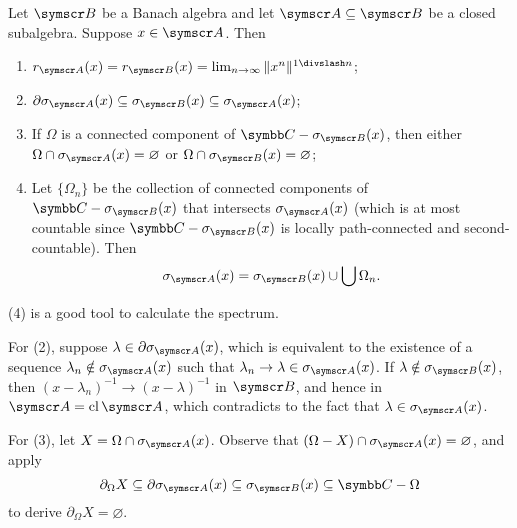 \begin{proposition}
  Let $\BA B$ be a Banach algebra and let $\BA A\subseteq \BA B$ be a closed subalgebra. Suppose $x\in\BA A$. Then
  \begin{enumerate}[label=(\arabic*)]
    \item $r_{\BA A}(x) = r_{\BA B}(x) = \lim_{n\to\infty}\NORM{x^n}^{1\DIV n}$;
    \item $\partial\sigma_{\BA A}(x)\subseteq\sigma_{\BA B}(x)\subseteq \sigma_{\BA A}(x)$;
    \item If $\Omega$ is a connected component of $\CC - \sigma_{\BA B}(x)$, then either $\Omega\cap \sigma_{\BA A}(x)=\varnothing$ or $\Omega\cap \sigma_{\BA B}(x)=\varnothing$;
    \item Let $\{\Omega_n\}$ be the collection of connected components of $\CC - \sigma_{\BA B}(x)$ that intersects $\sigma_{\BA A}(x)$ (which is at most countable since $\CC - \sigma_{\BA B}(x)$ is locally path-connected and second-countable). Then
    \begin{equation}
      \sigma_{\BA A}(x)=\sigma_{\BA B}(x)\cup\bigcup \Omega_n.
    \end{equation}
  \end{enumerate}
\end{proposition}

(4) is a good tool to calculate the spectrum.

\begin{sketch}
  For (2), suppose $\lambda\in\partial\sigma_{\BA A}(x)$, which is equivalent to the existence of a sequence $\lambda_n\notin \sigma_{\BA A}(x)$ such that $\lambda_n\to \lambda\in \sigma_{\BA A}(x)$. If $\lambda\notin \sigma_{\BA B}(x)$, then $(x-\lambda_n)^{-1}\to (x-\lambda)^{-1}$ in $\BA B$, and hence in $\BA A = \CL \BA A$, which contradicts to the fact that $\lambda\in\sigma_{\BA A}(x)$.

  For (3), let $X = \Omega\cap \sigma_{\BA A}(x)$. Observe that $(\Omega-X)\cap \sigma_{\BA A}(x)=\varnothing$, and apply
  \begin{equation*}
    \partial_\Omega X\subseteq\partial\sigma_{\BA A}(x)\subseteq\sigma_{\BA B}(x)\subseteq \CC-\Omega
  \end{equation*}
  to derive $\partial_\Omega X = \varnothing$.
\end{sketch}

